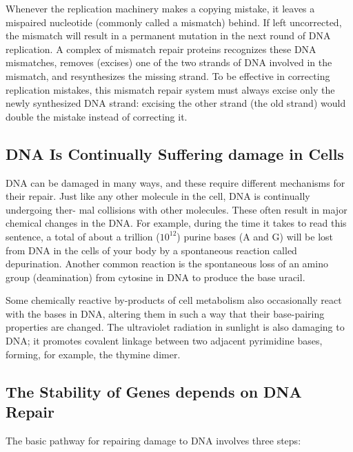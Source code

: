 Whenever the replication machinery makes a copying mistake, it leaves
a mispaired nucleotide (commonly called a mismatch) behind. If left
uncorrected, the mismatch will result in a permanent mutation in the
next round of DNA replication. A complex of mismatch
repair proteins recognizes these DNA mismatches, removes (excises) one
of the two strands of DNA involved in the mismatch, and resynthesizes
the missing strand. To be effective in correcting replication
mistakes, this mismatch repair system must always excise only the newly
synthesized DNA strand: excising the other strand (the old strand) would
double the mistake instead of correcting it.

\subsection{DNA Is Continually Suffering damage in Cells}
DNA can be damaged in many ways, and these require different mechanisms for their repair. Just
like any other molecule in the cell, DNA is continually undergoing ther-
mal collisions with other molecules. These often result in major chemical
changes in the DNA. For example, during the time it takes to read this
sentence, a total of about a trillion ($10^12$) purine bases (A and G) will be
lost from DNA in the cells of your body by a spontaneous reaction called
depurination.
Another common reaction is the spontaneous loss of an amino
group (deamination) from cytosine in DNA to produce the base uracil.

Some chemically reactive by-products of cell metabolism
also occasionally react with the bases in DNA, altering them in such a
way that their base-pairing properties are changed. The ultraviolet radiation
in sunlight is also damaging to DNA; it promotes covalent linkage
between two adjacent pyrimidine bases, forming, for example, the thymine dimer.

\subsection{The Stability of Genes depends on DNA Repair}

The basic pathway for repairing damage to DNA involves three steps:

